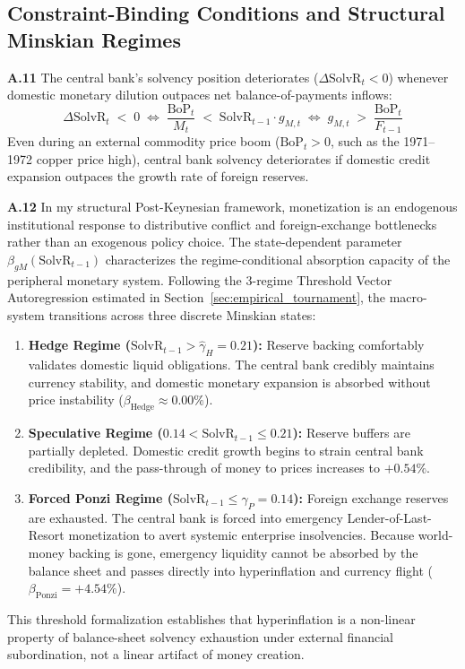 \subsection{Constraint-Binding Conditions and Structural Minskian Regimes}
\label{app:constraint_cases}

\textbf{A.11} The central bank's solvency position deteriorates ($\Delta\text{SolvR}_t < 0$) whenever domestic monetary dilution outpaces net balance-of-payments inflows:
\begin{equation}
	\label{app:eq:binding}
	\Delta\text{SolvR}_t \;<\; 0 \;\iff\; \frac{\text{BoP}_t}{M_t} \;<\; \text{SolvR}_{t-1} \cdot g_{M,t} \;\iff\; g_{M,t} \;>\; \frac{\text{BoP}_t}{F_{t-1}}
\end{equation}
Even during an external commodity price boom ($\text{BoP}_t > 0$, such as the 1971--1972 copper price high), central bank solvency deteriorates if domestic credit expansion outpaces the growth rate of foreign reserves.

\textbf{A.12} In my structural Post-Keynesian framework, monetization is an endogenous institutional response to distributive conflict and foreign-exchange bottlenecks rather than an exogenous policy choice. The state-dependent parameter $\beta_{gM}(\text{SolvR}_{t-1})$ characterizes the regime-conditional absorption capacity of the peripheral monetary system. Following the 3-regime Threshold Vector Autoregression estimated in Section~\ref{sec:empirical_tournament}, the macro-system transitions across three discrete Minskian states:
\begin{enumerate}[leftmargin=2em]
	\item \textbf{Hedge Regime ($\text{SolvR}_{t-1} > \hat{\gamma}_H = 0.21$):} Reserve backing comfortably validates domestic liquid obligations. The central bank credibly maintains currency stability, and domestic monetary expansion is absorbed without price instability ($\beta_{\text{Hedge}} \approx 0.00\%$).
	\item \textbf{Speculative Regime ($0.14 < \text{SolvR}_{t-1} \le 0.21$):} Reserve buffers are partially depleted. Domestic credit growth begins to strain central bank credibility, and the pass-through of money to prices increases to $+0.54\%$.
	\item \textbf{Forced Ponzi Regime ($\text{SolvR}_{t-1} \le \hat{\gamma}_P = 0.14$):} Foreign exchange reserves are exhausted. The central bank is forced into emergency Lender-of-Last-Resort monetization to avert systemic enterprise insolvencies. Because world-money backing is gone, emergency liquidity cannot be absorbed by the balance sheet and passes directly into hyperinflation and currency flight ($\beta_{\text{Ponzi}} = +4.54\%$).
\end{enumerate}
This threshold formalization establishes that hyperinflation is a non-linear property of balance-sheet solvency exhaustion under external financial subordination, not a linear artifact of money creation.
